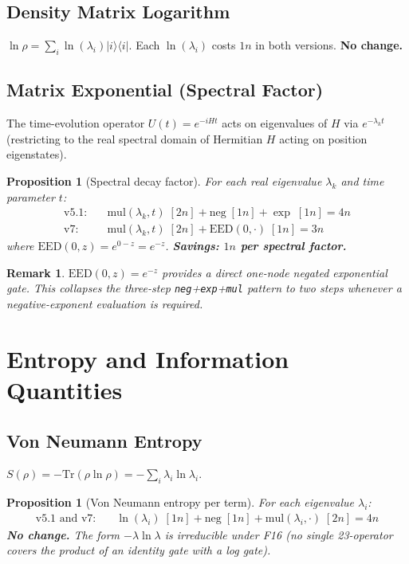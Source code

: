 \documentclass[11pt]{article}
\newtheorem{proposition}[theorem]{Proposition}
\newtheorem{remark}[theorem]{Remark}
\begin{document}
\subsection{Density Matrix Logarithm}

$\ln\rho = \sum_i \ln(\lambda_i)|i\rangle\langle i|$. Each $\ln(\lambda_i)$ costs $1n$ in both versions.
\textbf{No change.}

\subsection{Matrix Exponential (Spectral Factor)}

The time-evolution operator $U(t)=e^{-iHt}$ acts on eigenvalues of $H$ via $e^{-\lambda_k t}$
(restricting to the real spectral domain of Hermitian $H$ acting on position eigenstates).

\begin{proposition}[Spectral decay factor]
For each real eigenvalue $\lambda_k$ and time parameter $t$:
\begin{align*}
\text{v5.1:} &\quad \mathrm{mul}(\lambda_k, t)\;[2n] + \mathrm{neg}\;[1n] + \exp\;[1n] = 4n \\
\text{v7:}   &\quad \mathrm{mul}(\lambda_k, t)\;[2n] + \mathrm{EED}(0,\cdot)\;[1n] = 3n
\end{align*}
where $\mathrm{EED}(0, z)=e^{0-z}=e^{-z}$.
\textbf{Savings: $1n$ per spectral factor.}
\end{proposition}

\begin{remark}
$\mathrm{EED}(0, z) = e^{-z}$ provides a direct one-node negated exponential gate.
This collapses the three-step \texttt{neg}+\texttt{exp}+\texttt{mul} pattern to two steps
whenever a negative-exponent evaluation is required.
\end{remark}

\section{Entropy and Information Quantities}

\subsection{Von Neumann Entropy}

$S(\rho)=-\mathrm{Tr}(\rho\ln\rho)=-\sum_i\lambda_i\ln\lambda_i$.

\begin{proposition}[Von Neumann entropy per term]
For each eigenvalue $\lambda_i$:
\begin{align*}
\text{v5.1 and v7:} &\quad \ln(\lambda_i)\;[1n] + \mathrm{neg}\;[1n] + \mathrm{mul}(\lambda_i,\cdot)\;[2n] = 4n
\end{align*}
\textbf{No change.} The form $-\lambda\ln\lambda$ is irreducible under F16 (no single 23-operator
covers the product of an identity gate with a log gate).
\end{proposition}
\end{document}
